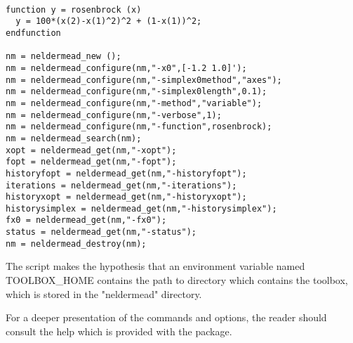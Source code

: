 \lstset{language=Scilab}
\lstset{numbers=left}
\lstset{basicstyle=\footnotesize}
\lstset{keywordstyle=\bfseries}
\begin{lstlisting}

function y = rosenbrock (x)
  y = 100*(x(2)-x(1)^2)^2 + (1-x(1))^2;
endfunction

nm = neldermead_new ();
nm = neldermead_configure(nm,"-x0",[-1.2 1.0]');
nm = neldermead_configure(nm,"-simplex0method","axes");
nm = neldermead_configure(nm,"-simplex0length",0.1);
nm = neldermead_configure(nm,"-method","variable");
nm = neldermead_configure(nm,"-verbose",1);
nm = neldermead_configure(nm,"-function",rosenbrock);
nm = neldermead_search(nm);
xopt = neldermead_get(nm,"-xopt");
fopt = neldermead_get(nm,"-fopt");
historyfopt = neldermead_get(nm,"-historyfopt");
iterations = neldermead_get(nm,"-iterations");
historyxopt = neldermead_get(nm,"-historyxopt");
historysimplex = neldermead_get(nm,"-historysimplex");
fx0 = neldermead_get(nm,"-fx0");
status = neldermead_get(nm,"-status");
nm = neldermead_destroy(nm);
\end{lstlisting}

The script makes the hypothesis that an environment variable 
named TOOLBOX\_HOME contains the path to directory 
which contains the toolbox, which is stored in the "neldermead" directory.

For a deeper presentation of the commands and options, the reader 
should consult the help which is provided with the package.



